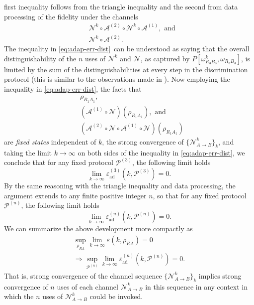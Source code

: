 \documentclass[apsrev,twocolumn]{revtex4-1}%
\begin{document}
first inequality follows from the triangle inequality and the second from data
processing of the fidelity under the channels%
\begin{align}
&  \mathcal{N}^{k}\circ\mathcal{A}^{(2)}\circ\mathcal{N}^{k}\circ
\mathcal{A}^{(1)},\text{ and}\\
&  \mathcal{N}^{k}\circ\mathcal{A}^{(2)}.
\end{align}
The inequality in \eqref{eq:adap-err-dist}\ can be understood as saying that
the overall distinguishability of the $n$ uses of $\mathcal{N}^{k}$ and
$\mathcal{N}$, as captured by $P\left[  \omega_{R_{3}B_{3}}^{k},\omega
_{R_{3}B_{3}}\right]  $, is limited by the sum of the distinguishabilities at
every step in the discrimination protocol (this is similar to the observations
made in \cite{BBBV97,BBHT98,Z99,BHLS03,CMW14,TGW14,TGW14Nat,Christandl2017}).
Now employing the inequality in \eqref{eq:adap-err-dist}, the facts that%
\begin{align}
&  \rho_{R_{1}A_{1}},\\
&  (\mathcal{A}^{(1)}\circ\mathcal{N})(\rho_{R_{1}A_{1}}),\text{ and}\\
&  (\mathcal{A}^{(2)}\circ\mathcal{N}\circ\mathcal{A}^{(1)}\circ
\mathcal{N})(\rho_{R_{1}A_{1}})
\end{align}
are \textit{fixed states} independent of $k$, the strong convergence of
$\{\mathcal{N}_{A\rightarrow B}^{k}\}_{k}$, and taking the limit
$k\rightarrow\infty$ on both sides of the inequality in
\eqref{eq:adap-err-dist}, we conclude that for any fixed protocol
$\mathcal{P}^{(3)}$, the following limit holds%
\begin{equation}
\lim_{k\rightarrow\infty}\varepsilon_{\text{ad}}^{(3)}(k,\mathcal{P}^{(3)})=0.
\end{equation}
By the same reasoning with the triangle inequality and data processing, the
argument extends to any finite positive integer $n$, so that for any fixed
protocol $\mathcal{P}^{(n)}$, the following limit holds%
\begin{equation}
\lim_{k\rightarrow\infty}\varepsilon_{\text{ad}}^{(n)}(k,\mathcal{P}^{(n)})=0.
\end{equation}
We can summarize the above development more compactly as%
\begin{multline}
\sup_{\rho_{RA}}\lim_{k\rightarrow\infty}\varepsilon(k,\rho_{RA}%
)=0\label{eq:strong-conv-arbitrary}\\
\Longrightarrow\sup_{\mathcal{P}^{(n)}}\lim_{k\rightarrow\infty}%
\varepsilon_{\text{ad}}^{(n)}(k,\mathcal{P}^{(n)})=0.
\end{multline}
That is, strong convergence of the channel sequence $\{\mathcal{N}%
_{A\rightarrow B}^{k}\}_{k}$ implies strong convergence of $n$ uses of each
channel $\mathcal{N}_{A\rightarrow B}^{k}$ in this sequence in any context in
which the $n$ uses of $\mathcal{N}_{A\rightarrow B}^{k}$ could be invoked.
\end{document}
